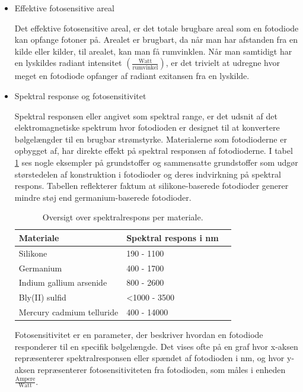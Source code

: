 \begin{itemize}
    \item Effektive fotosensitive areal

Det effektive fotosensitive areal, er det totale brugbare areal som en fotodiode kan opfange fotoner på. Arealet er brugbart, da når man har afstanden fra en kilde eller kilder, til arealet, kan man få rumvinklen. Når man samtidigt har en lyskildes radiant intensitet $\left ( \frac{\text{Watt}}{\text{rumvinkel}} \right )$, er det trivielt at udregne hvor meget en fotodiode opfanger af radiant exitansen fra en lyskilde.

    \item Spektral response og fotosensitivitet

Spektral responsen eller angivet som spektral range, er det udsnit af det elektromagnetiske spektrum hvor fotodioden er designet til at konvertere bølgelængder til en brugbar strømstyrke. Materialerne som fotodioderne er opbygget af, har direkte effekt på spektral responsen af fotodioderne. I tabel \ref{tab:spektralrespons} ses nogle eksempler på grundstoffer og sammensatte grundstoffer som udgør størstedelen af konstruktion i fotodioder og deres indvirkning på spektral respons. Tabellen reflekterer faktum at silikone-baserede fotodioder generer mindre støj end germanium-baserede fotodioder.


\begin{table}[h]
\centering
\caption{Oversigt over spektralrespons per materiale.}
\label{tab:spektralrespons}
\begin{tabular}{lll}
\toprule
Materiale & Spektral respons i nm \\
\midrule
Silikone & 190 - 1100  \\
Germanium & 400 - 1700 \\
Indium gallium arsenide & 800 - 2600  \\
Bly(II) sulfid & <1000 - 3500  \\
Mercury cadmium telluride & 400 - 14000  \\
\bottomrule
\end{tabular}
\end{table}

Fotosensitivitet er en parameter, der beskriver hvordan en fotodiode responderer til en specifik bølgelængde. Det vises ofte på en graf hvor x-aksen repræsenterer spektralresponsen eller spændet af fotodioden i nm, og hvor y-aksen repræsenterer fotosensitiviteten fra fotodioden, som måles i enheden $\frac{\text{Ampere}}{\text{Watt}}$.


\end{itemize}
